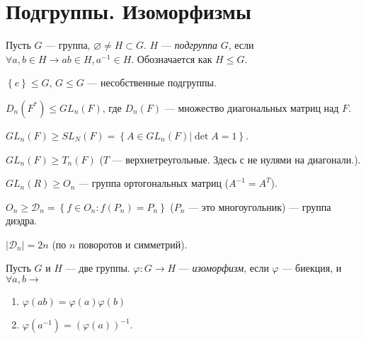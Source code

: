 \section{Подгруппы. Изоморфизмы}

\begin{define*}
  Пусть $G$ --- группа, $\varnothing \neq H \subset G$. $H$ --- \emph{подгруппа} $G$, если $\forall a, b \in H \to ab \in H, a^{-1} \in H$. 
  Обозначается как $H \le G$.
\end{define*}

\begin{define*}
  $\left\{ e \right\} \le G$, $G \le G$ --- несобственные подгруппы.
\end{define*}

\begin{example}
  $D_n(F^*) \le GL_n(F)$, где $D_n(F)$ --- множество диагональных матриц над $F$.
\end{example}

\begin{example}
  $GL_n(F) \ge SL_N(F) = \left\{ A \in GL_n(F) | \det{A} = 1 \right\}$.
\end{example}

\begin{exercise}
  $GL_n(F) \ge T_n(F)$ ($T$ --- верхнетреугольные. Здесь с не нулями на диагонали.).
\end{exercise}

\begin{example}
  $GL_n(R)	\ge O_n$ --- группа ортогональных матриц ($A^{-1} = A^T$).
\end{example}

\begin{example}
  $O_n \ge \mathcal{D}_n = \left\{ f \in O_n: f(P_n) = P_n \right\}$ ($P_n$ --- это многоугольник) --- группа диэдра.
\end{example}

\begin{exercise}
  $|\mathcal{D}_n| = 2n$ (по $n$ поворотов и симметрий).
\end{exercise}

\begin{define*}
  Пусть $G$ и $H$ --- две группы. $\varphi: G\to H$ --- \emph{изоморфизм}, если $\varphi$ --- биекция, и $\forall a, b \to$
  \begin{enumerate}
	\item $\varphi(ab) = \varphi(a)\varphi(b)$
	\item $\varphi(a^{-1}) = (\varphi(a))^{-1}$.
  \end{enumerate}
\end{define*}

